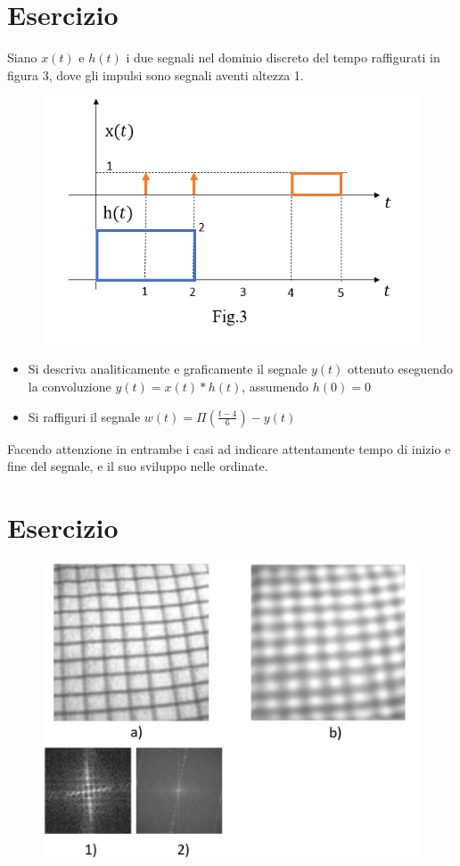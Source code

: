 \documentclass[a4paper]{article}
\begin{document}
	\section{Esercizio}
	
	Siano $x\left(t\right)$ e $h\left(t\right)$ i due segnali nel dominio discreto del tempo raffigurati in figura 3, dove gli impulsi sono 
	segnali aventi altezza 1.
	\begin{figure}[!htp]
		\centering
		\includegraphics[width=.6\textwidth]{img/fig_3.png}
	\end{figure}
	
	\begin{itemize}
		\item Si descriva analiticamente e graficamente il segnale $y\left(t\right)$ ottenuto eseguendo la convoluzione $y\left(t\right) = x\left(t\right) * h\left(t\right)$, assumendo $h\left(0\right) = 0$
		
		\item Si raffiguri il segnale $w\left(t\right) = \Pi\left(\frac{t-4}{6}\right) - y\left(t\right)$
	\end{itemize}
	Facendo attenzione in entrambe i casi ad indicare attentamente tempo di inizio e fine del segnale, e il suo sviluppo nelle ordinate.\newpage
	
	\section{Esercizio}
	
	\begin{figure}[!htp]
		\centering
		\includegraphics[width=\textwidth]{img/fig_4.png}
	\end{figure}
\end{document}
